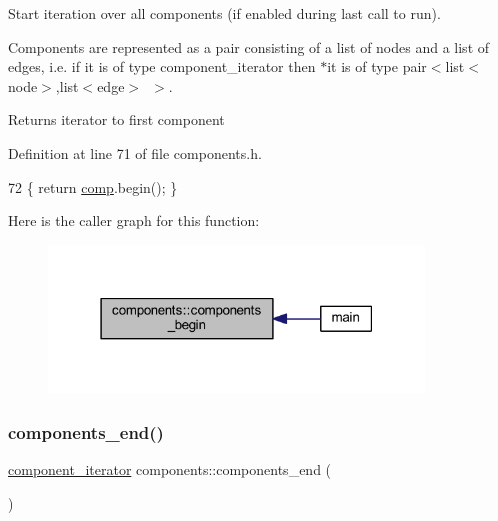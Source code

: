 Start iteration over all components (if enabled during last call to run). 

Components are represented as a pair consisting of a list of nodes and a list of edges, i.\+e. if {\ttfamily it} is of type {\ttfamily component\+\_\+iterator} then {\ttfamily $\ast$it} is of type {\ttfamily pair$<$list$<$node$>$},list$<$edge$>$~$>$.

\begin{DoxyReturn}{Returns}
iterator to first component 
\end{DoxyReturn}


Definition at line 71 of file components.\+h.


\begin{DoxyCode}
72     \{ \textcolor{keywordflow}{return} \mbox{\hyperlink{classcomponents_a99483a9e5f031e6e6e2e5b0c47c2979e}{comp}}.begin(); \}
\end{DoxyCode}
Here is the caller graph for this function\+:\nopagebreak
\begin{figure}[H]
\begin{center}
\leavevmode
\includegraphics[width=283pt]{classcomponents_a8a645639044375cdaefabffda3ae70e0_icgraph}
\end{center}
\end{figure}
\mbox{\label{classcomponents_a8537c6e4c6a29a4ae05a937b5fda1fb9}} 
\subsubsection{\texorpdfstring{components\+\_\+end()}{components\_end()}}
{\footnotesize\ttfamily \mbox{\hyperlink{classcomponents_a0954ef13f83f3c1ac6cd4474cac17a36}{component\+\_\+iterator}} components\+::components\+\_\+end (\begin{DoxyParamCaption}{ }\end{DoxyParamCaption})\hspace{0.3cm}{\ttfamily [inline]}}



